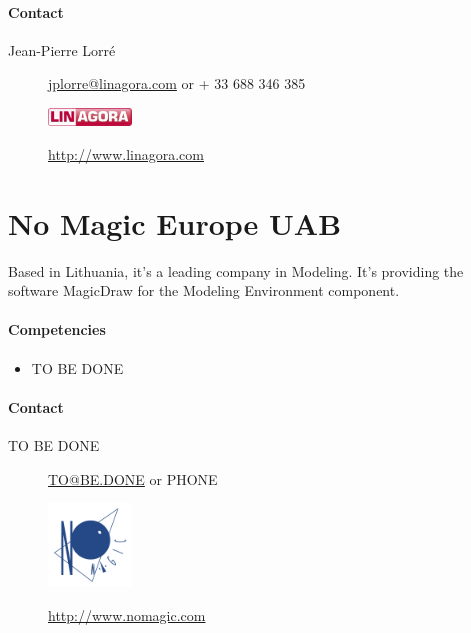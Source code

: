 \documentclass{learnpad}
\begin{document}
\paragraph{Contact}
\begin{description}
	\item[Jean-Pierre Lorré] \href{mailto:jplorre@linagora.com}{jplorre@linagora.com} or + 33 688 346 385
\end{description}

\begin{figure}[!htp]
	\centering
	\includegraphics[width=6em,keepaspectratio]{figures/linagora.png}\par
	\url{http://www.linagora.com}
\end{figure}

\section{No Magic Europe UAB}
Based in Lithuania, it's a leading company in Modeling.  It's providing the
software MagicDraw for the Modeling Environment component.

\paragraph{Competencies}
\begin{itemize}
	\item TO BE DONE
\end{itemize}

\paragraph{Contact}
\begin{description}
	\item[TO BE DONE] \href{mailto:TO@BE.DONE}{TO@BE.DONE} or PHONE
\end{description}

\begin{figure}[!htp]
	\centering
	\includegraphics[width=6em,keepaspectratio]{figures/nme.png}\par
	\url{http://www.nomagic.com}
\end{figure}
\end{document}
